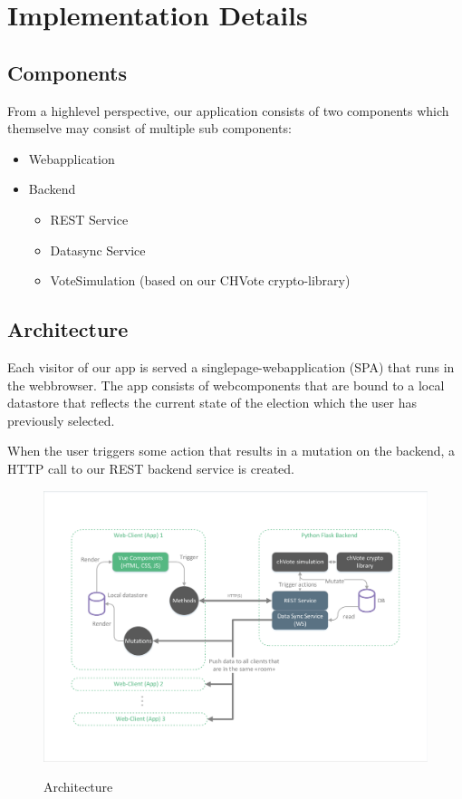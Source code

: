 \chapter{Implementation Details}
\section{Components}
From a highlevel perspective, our application consists of two components which themselve may consist of multiple sub components:
\begin{itemize}
	\item Webapplication
	\item Backend
	\begin{itemize}
		\item REST Service
		\item Datasync Service
		\item VoteSimulation (based on our CHVote crypto-library)
	\end{itemize}
\end{itemize}

\section{Architecture}
Each visitor of our app is served a singlepage-webapplication (SPA) that runs in the webbrowser. The app consists of webcomponents that are bound to a local datastore that reflects the current state of the election which the user has previously selected.

When the user triggers some action that results in a mutation on the backend, a HTTP call to our REST backend service is created. 
\begin{figure}[h!]
\begin{center}
\includegraphics[scale=0.65]{assets/architecture.pdf}\\
\caption{Architecture}
\end{center}
\end{figure}


